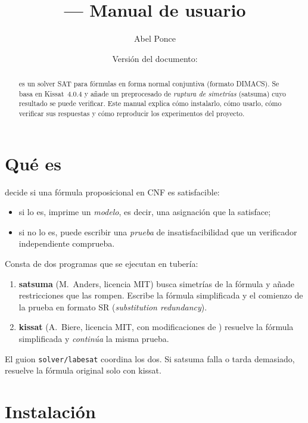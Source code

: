 \documentclass[11pt,a4paper]{article}
\title{\labesat{} --- Manual de usuario}
\author{Abel Ponce}
\date{Versión del documento: \versiondoc}
\begin{document}
\maketitle

\begin{abstract}
\noindent
\labesat{} es un solver SAT para fórmulas en forma normal conjuntiva (formato
DIMACS). Se basa en Kissat~4.0.4 y añade un preprocesado de \emph{ruptura de
simetrías} (satsuma) cuyo resultado se puede verificar. Este manual explica
cómo instalarlo, cómo usarlo, cómo verificar sus respuestas y cómo reproducir
los experimentos del proyecto.
\end{abstract}

\tableofcontents

\section{Qué es \labesat{}}

\labesat{} decide si una fórmula proposicional en CNF es satisfacible:
\begin{itemize}
  \item si lo es, imprime un \emph{modelo}, es decir, una asignación que la
        satisface;
  \item si no lo es, puede escribir una \emph{prueba} de insatisfacibilidad que
        un verificador independiente comprueba.
\end{itemize}

Consta de dos programas que se ejecutan en tubería:
\begin{enumerate}
  \item \textbf{satsuma} (M.~Anders, licencia MIT) busca simetrías de la
        fórmula y añade restricciones que las rompen. Escribe la fórmula
        simplificada y el comienzo de la prueba en formato SR
        (\emph{substitution redundancy}).
  \item \textbf{kissat} (A.~Biere, licencia MIT, con modificaciones de
        \labesat{}) resuelve la fórmula simplificada y \emph{continúa} la misma
        prueba.
\end{enumerate}

El guion \texttt{solver/labesat} coordina los dos. Si satsuma falla o tarda
demasiado, resuelve la fórmula original solo con kissat.

\section{Instalación}
\end{document}
